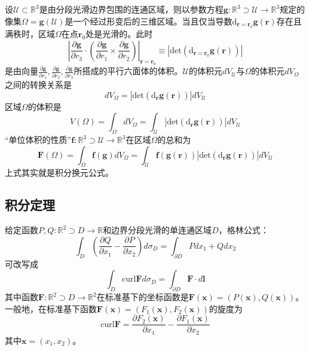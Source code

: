 \documentclass[../main.tex]{subfiles}
\begin{document}
设$\mathcal{U}\subset\mathbb{R}^3$是由分段光滑边界包围的连通区域，则以参数方程$\mathbf{g}:\mathbb{R}^3\supset \mathcal{U}\rightarrow\mathbb{R}^3$规定的像集$\Omega=\mathbf{g}\left(\mathcal{U}\right)$是一个经过形变后的三维区域。当且仅当导数$\mathrm{d}_{\mathbf{r}=\mathbf{r}_0}\mathbf{g}\left(\mathbf{r}\right)$存在且满秩时，区域$\Omega$在点$\mathbf{r}_0$处是光滑的。此时
\[
    \left|\frac{\partial \mathbf{g}}{\partial r_3}\cdot\left(\frac{\partial\mathbf{g}}{\partial r_1}\times\frac{\partial\mathbf{g}}{\partial r_2}\right)\right|_{\mathbf{r}=\mathbf{r}_0}\equiv\left|\mathrm{det}\left(\mathrm{d}_{\mathbf{r}=\mathbf{r}_0}\mathbf{g}\left(\mathbf{r}\right)\right)\right|
\]
是由向量$\frac{\partial\mathbf{g}}{\partial r_1},\frac{\partial\mathbf{g}}{\partial r_2},\frac{\partial\mathbf{g}}{\partial r_3}$所搭成的平行六面体的体积。$\mathcal{U}$的体积元$dV_\mathcal{U}$与$\Omega$的体积元$dV_\Omega$之间的转换关系是
\[dV_\Omega=\left|\mathrm{det}\left(\mathrm{d}_{\mathbf{r}}\mathbf{g}\left(\mathbf{r}\right)\right)\right|
    dV_\mathcal{U}\]
区域$\Omega$的体积是
\[
    V\left(\Omega\right)=\int_\Omega dV_\Omega=\int_\mathcal{U}\left|\mathrm{det}\left(\mathrm{d}_{\mathbf{r}}\mathbf{g}\left(\mathbf{r}\right)\right)\right|dV_\mathcal{U}
\]
“单位体积的性质”$\mathbf{f}:\mathbb{R}^3\supset\mathcal{U}\rightarrow\mathbb{R}^3$在区域$\Omega$的总和为
\[
    \mathbf{F}\left(\Omega\right)=\int_\Omega\mathbf{f}\left(\mathbf{g}\right)dV_\Omega=\int_\mathcal{U}\mathbf{f}\left(\mathbf{g}\left(\mathbf{r}\right)\right)\left|\mathrm{det}\left(\mathrm{d}_{\mathbf{r}}\mathbf{g}\left(\mathbf{r}\right)\right)\right|dV_\mathcal{U}
\]
上式其实就是积分换元公式。

\subsection{积分定理}
给定函数$P,Q:\mathbb{R}^2\supset D\rightarrow\mathbb{R}$和边界分段光滑的单连通区域$D$，格林公式：
\[\int_D\left(\frac{\partial Q}{\partial x_1}-\frac{\partial P}{\partial x_2}\right)d\sigma_D=\int_{\partial D}Pdx_1+Qdx_2
\]
可改写成
\[
    \int_D\mathrm{curl}\mathbf{F}d\sigma_D=\int_{\partial D}\mathbf{F}\cdot d\mathbf{l}
\]
其中函数$\mathbf{F}:\mathbb{R}^2\supset D\rightarrow\mathbb{R}^2$在标准基下的坐标函数是$\mathbf{F}\left(\mathbf{x}\right)=\left(P\left(\mathbf{x}\right),Q\left(\mathbf{x}\right)\right)$。一般地，在标准基下函数$\mathbf{F}\left(\mathbf{x}\right)=\left(F_1\left(\mathbf{x}\right),F_2\left(\mathbf{x}\right)\right)$的旋度为
\[\mathrm{curl}\mathbf{F}=\frac{\partial F_2\left(\mathbf{x}\right)}{\partial x_1}-\frac{\partial F_1\left(\mathbf{x}\right)}{\partial x_2}\]
其中$\mathbf{x}=\left(x_1,x_2\right)$。
\end{document}
